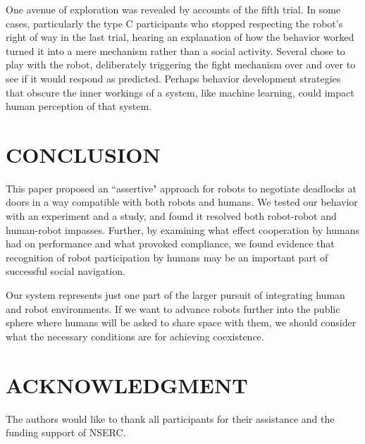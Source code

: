 \documentclass[letterpaper, 10 pt, conference]{ieeeconf}  %
\begin{document}
One avenue of exploration was revealed by accounts of the fifth trial. In some cases, particularly the type C participants who stopped respecting the robot's right of way in the last trial, hearing an explanation of how the behavior worked turned it into a mere mechanism rather than a social activity. Several chose to play with the robot, deliberately triggering the fight mechanism over and over to see if it would respond as predicted. Perhaps behavior development strategies that obscure the inner workings of a system, like machine learning, could impact human perception of that system.

\section{CONCLUSION}

This paper proposed an ``assertive" approach for robots to negotiate deadlocks at doors in a way compatible with both robots and humans. We tested our behavior with an experiment and a study, and found it resolved both robot-robot and human-robot impasses. Further, by examining what effect cooperation by humans had on performance and what provoked compliance, we found evidence that recognition of robot participation by humans may be an important part of successful social navigation.

Our system represents just one part of the larger pursuit of integrating human and robot environments. If we want to advance robots further into the public sphere where humans will be asked to share space with them, we should consider what the necessary conditions are for achieving coexistence.

\section*{ACKNOWLEDGMENT}

The authors would like to thank all participants for their assistance and the funding support of NSERC.
\end{document}

